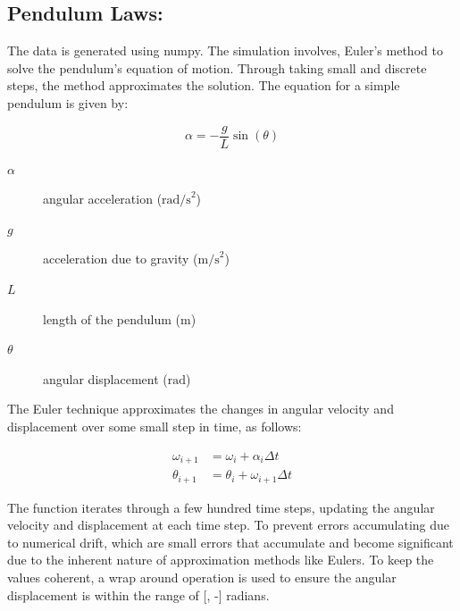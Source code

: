 \documentclass{article}
\begin{document}


\subsection{Pendulum Laws:}

The data is generated using numpy. The simulation involves, Euler's method to solve the pendulum's equation of motion. Through taking small and discrete steps, the method approximates the solution. The equation for a simple pendulum is given by: \\



\begin{center}
\begin{equation}
\alpha = -\frac{g}{L} \sin(\theta)
\end{equation}
\end{center}

\begin{description}
    \item[\(\alpha\)] angular acceleration (\(\text{rad/s}^2\))
    \item[\(g\)] acceleration due to gravity (\(\text{m/s}^2\))
    \item[\(L\)] length of the pendulum (\(\text{m}\))
    \item[\(\theta\)] angular displacement (\(\text{rad}\))
\end{description}

The Euler technique approximates the changes in angular velocity and displacement over some small step in time, as follows:\\

\begin{center}
\begin{align} 
\omega_{i+1} &= \omega_i + \alpha_i \Delta t \\
\theta_{i+1} &= \theta_i + \omega_{i+1} \Delta t 
\end{align}
\end{center}


The function iterates through a few hundred time steps, updating the angular velocity and displacement at each time step. To prevent errors accumulating due to numerical drift, which are small errors that accumulate and become significant due to the inherent nature of approximation methods like Eulers. To keep the values coherent, a wrap around operation is used to ensure the angular displacement is within the range of [\pi, -\pi] radians.\\ 
\end{document}
